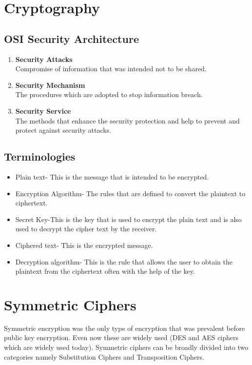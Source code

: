 \documentclass{article}
\begin{document}
\section{Cryptography}
\subsection{OSI Security Architecture}
\begin{enumerate}
    \item \textbf{Security Attacks}\\
    Compromise of information that was intended not to be shared.
    \item \textbf{Security Mechanism}\\
    The procedures which are adopted to stop information breach.
    \item \textbf{Security Service}\\
    The methods that enhance the security protection and help to prevent and protect against security attacks.
\end{enumerate}
\subsection{Terminologies}
\begin{itemize}
    \item Plain text- This is the message that is intended to be encrypted.
    \item Encryption Algorithm- The rules that are defined to convert the plaintext to ciphertext.
    \item Secret Key-This is the key that is used to encrypt the plain text and is also used to decrypt the cipher text by the receiver.
    \item Ciphered text- This is the encrypted message.
    \item Decryption algorithm- This is the rule that allows the user to obtain the plaintext from the ciphertext often with the help of the key.
\end{itemize}

\section{Symmetric Ciphers}
Symmetric encryption was the only type of encryption that was prevalent before public key encryption. Even now these are widely used (DES and AES ciphers which are widely used today). Symmetric ciphers can be broadly divided into two categories namely Substitution Ciphers and Transposition Ciphers.
\end{document}
